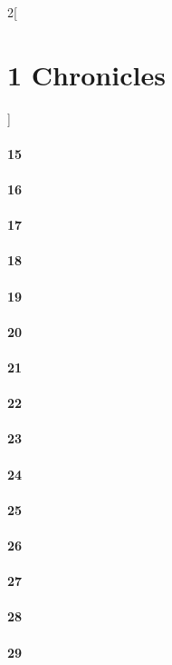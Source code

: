 \documentclass{book}
\begin{document}
\begin{multicols}{2}[\part{1 Chronicles}]
\subsection*{15}
\subsection*{16}
\subsection*{17}
\subsection*{18}
\subsection*{19}
\subsection*{20}
\subsection*{21}
\subsection*{22}
\subsection*{23}
\subsection*{24}
\subsection*{25}
\subsection*{26}
\subsection*{27}
\subsection*{28}
\subsection*{29}
\end{multicols}
\end{document}
